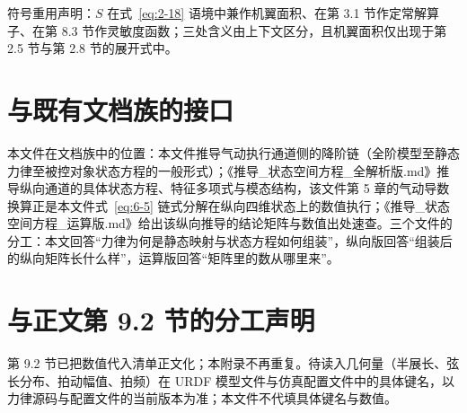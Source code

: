 \documentclass[11pt,a4paper]{ctexart}
\numberwithin{equation}{section}
\begin{document}
\noindent 符号重用声明：$S$ 在式~\eqref{eq:2-18} 语境中兼作机翼面积、在第 3.1 节作定常解算子、在第 8.3 节作灵敏度函数；三处含义由上下文区分，且机翼面积仅出现于第 2.5 节与第 2.8 节的展开式中。

\section{与既有文档族的接口}

本文件在文档族中的位置：本文件推导气动执行通道侧的降阶链（全阶模型至静态力律至被控对象状态方程的一般形式）；《推导\_状态空间方程\_全解析版.md》推导纵向通道的具体状态方程、特征多项式与模态结构，该文件第 5 章的气动导数换算正是本文件式~\eqref{eq:6-5} 链式分解在纵向四维状态上的数值执行；《推导\_状态空间方程\_运算版.md》给出该纵向推导的结论矩阵与数值出处速查。三个文件的分工：本文回答“力律为何是静态映射与状态方程如何组装”，纵向版回答“组装后的纵向矩阵长什么样”，运算版回答“矩阵里的数从哪里来”。

\section{与正文第 9.2 节的分工声明}

第 9.2 节已把数值代入清单正文化；本附录不再重复。待读入几何量（半展长、弦长分布、拍动幅值、拍频）在 URDF 模型文件与仿真配置文件中的具体键名，以力律源码与配置文件的当前版本为准；本文件不代填具体键名与数值。
\end{document}
